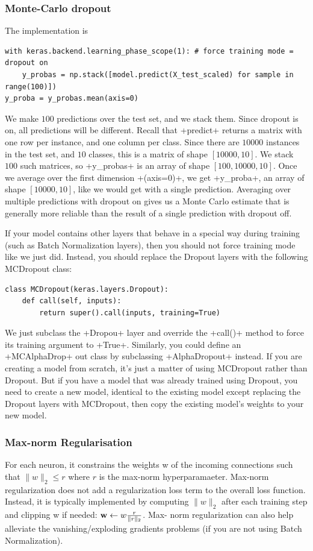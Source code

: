 \subsubsection{Monte-Carlo dropout}
The implementation is
\begin{lstlisting}
with keras.backend.learning_phase_scope(1): # force training mode = dropout on 
	y_probas = np.stack([model.predict(X_test_scaled) for sample in range(100)]) 
y_proba = y_probas.mean(axis=0)
\end{lstlisting}
We make $100$ predictions over the test set, and we stack them. Since dropout is on, all predictions will be different. Recall that \cd+predict+ returns a matrix with one row per instance, and one column per class. Since there are $10000$ instances in the test set, and $10$ classes, this is a matrix of shape $[10000, 10]$. We stack $100$ such matrices, so \cd+y_probas+ is an array of shape $[100, 10000, 10]$. Once we average over the first dimension \cd+(axis=0)+, we get \cd+y_proba+, an array of shape $[10000, 10]$, like we would get with a single prediction. Averaging over multiple predictions with dropout on gives us a Monte Carlo estimate that is generally more reliable than the result of a single prediction with dropout off.

If your model contains other layers that behave in a special way during training (such as Batch Normalization layers), then you should not force training mode like we just did. Instead, you should replace the Dropout layers with the following MCDropout class:
\begin{lstlisting}
class MCDropout(keras.layers.Dropout):
	def call(self, inputs):
		return super().call(inputs, training=True)
\end{lstlisting}
We just subclass the \cd+Dropou+ layer and override the \cd+call()+ method to force its training argument to \cd+True+. Similarly, you could define an \cd+MCAlphaDrop+ out class by subclassing \cd+AlphaDropout+ instead. If you are creating a model from scratch, it's just a matter of using MCDropout rather than Dropout. But if you have a model that was already trained using Dropout, you need to create a new model, identical to the existing model except replacing the Dropout layers with MCDropout, then copy the existing model's weights to your new model.

\subsubsection{Max-norm Regularisation}
For each neuron, it constrains the weights w of the incoming connections such that $\|w\|_2 \le r$ where $r$ is the max-norm hyperparamaeter. Max-norm regularization does not add a regularization loss term to the overall loss function. Instead, it is typically implemented by computing $\|w\|_2$ after each training
step and clipping w if needed: $\mathrm{\mathbf{w}}\leftarrow w\frac{r}{\|r\|_2}$. Max- norm regularization can also help alleviate the vanishing/exploding gradients problems (if you are not using Batch Normalization).

